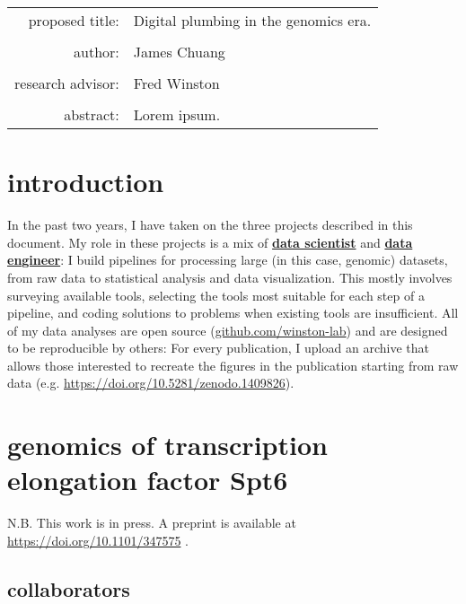 \documentclass[9pt, letterpaper]{article}
\begin{document}
\begin{titlepage}
\begin{tabular}{ r l }
 proposed title:   & Digital plumbing in the genomics era. \\
 		   & \\
 author:	   & James Chuang \\
 		   & \\
 research advisor: & Fred Winston \\
 		   & \\
 abstract:	   & Lorem ipsum.
\end{tabular}
\end{titlepage}

\tableofcontents
\newpage

\section{introduction}

In the past two years, I have taken on the three projects described in this document. My role in these projects is a mix of \href{https://blog.insightdatascience.com/data-science-vs-data-engineering-62da7678adaa}{\textbf{data scientist}} and \href{https://blog.insightdatascience.com/data-science-vs-data-engineering-62da7678adaa}{\textbf{data engineer}}: I build pipelines for processing large (in this case, genomic) datasets, from raw data to statistical analysis and data visualization. This mostly involves surveying available tools, selecting the tools most suitable for each step of a pipeline, and coding solutions to problems when existing tools are insufficient. All of my data analyses are open source (\href{https://github.com/winston-lab}{github.com/winston-lab}) and are designed to be reproducible by others: For every publication, I upload an archive that allows those interested to recreate the figures in the publication starting from raw data (e.g. \url{https://doi.org/10.5281/zenodo.1409826}).

\section{genomics of transcription elongation factor Spt6}

N.B. This work is in press. A preprint is available at \url{https://doi.org/10.1101/347575} \cite{doris2018}.

\subsection{collaborators}
\end{document}
